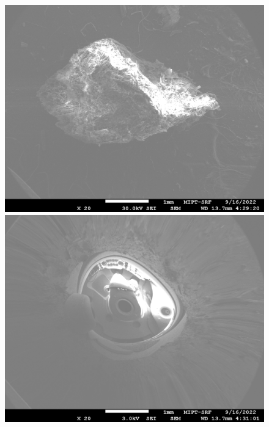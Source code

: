 \documentclass[a4paper,12pt]{article} %
\begin{document}
\begin{figure}[h]
\centering
\begin{minipage}{0.49\textwidth}
\includegraphics[width=\textwidth]{Foam001.jpg}
\vspace{-2em}
\end{minipage}
\begin{minipage}{0.49\textwidth}
\includegraphics[width=\textwidth]{Foam002.jpg}
\vspace{-2em}
\end{minipage}
\begin{minipage}{0.49\textwidth}

\end{minipage}
\end{figure}
\end{document}
